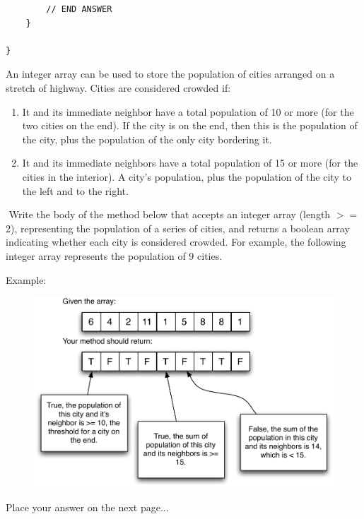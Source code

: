\documentclass[11pt,answers]{exam}
\begin{document}
\begin{questions}
\begin{verbatim}
        // END ANSWER
    }

}
\end{verbatim}

\newpage
\question[14] An integer array can be used to store the population of cities arranged on a stretch of highway. Cities are considered crowded if: 
\begin{enumerate}
	\item It and its immediate neighbor have a total population of 10 or more (for the two cities on the end).  If the city is on the end, then this is the population of the city, plus the population of the only city bordering it.
	\item It and its immediate neighbors have a total population of 15 or more (for the cities in the interior).   A city's population, plus the population of the city to the left and to the right.
\end{enumerate}
\par Write the body of the method below that accepts an integer array (length $>=$ 2), representing the population of a series of cities, and returns a boolean array indicating whether each city is considered crowded. For example, the following integer array represents the population of 9 cities. 

\par Example:
\begin{figure}[h]
    \begin{center}
        \includegraphics[width=6in]{finalExam_progQuestion_4}
    \end{center}
\end{figure}

\par Place your answer on the next page...


\end{questions}
\end{document}

